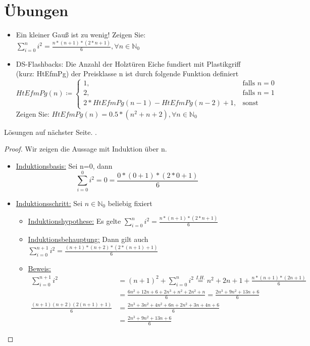 \documentclass[hidelinks]{article}
\theoremstyle{plain}
\theoremstyle{definition}
\theoremstyle{rem}
\begin{document}
\begin{sloppypar}
\section{Übungen}
\begin{itemize}
\item Ein kleiner Gauß ist zu wenig! Zeigen Sie: $\sum_{i=0}^{n}i^2=\frac{n*(n+1)*(2*n+1)}{6}, \forall n\in\mathbb{N}_0$
\item DS-Flashbacks: Die Anzahl der Holztüren Eiche fundiert mit Plastikgriff (kurz: HtEfmPg) der Preisklasse n ist durch folgende Funktion definiert
\begin{equation}
HtEfmPg(n)\coloneqq\begin{cases}
		1, & \text{falls $n=0$}\\
		2, & \text{falls $n=1$}\\
	   	2*HtEfmPg(n-1)-HtEfmPg(n-2)+1, & \text{sonst}
	\end{cases}
\end{equation}
Zeigen Sie: $HtEfmPg(n)=0.5*(n^2+n+2),\forall n\in\mathbb{N}_0$
\end{itemize}
Lösungen auf nächster Seite.
. \begin{proof}
Wir zeigen die Aussage mit Induktion über n.
\begin{itemize}
\item \underline{Induktionsbasis:} Sei n=0, dann
\begin{equation*}
	\sum_{i=0}^{0}i^2=0=\frac{0*(0+1)*(2*0+1)}{6}
\end{equation*}
\item \underline{Induktionsschritt:} Sei $n\in \mathbb{N}_0$ beliebig fixiert
	\begin{itemize}
	\item \underline{Induktionshypothese:} Es gelte $\sum_{i=0}^{n}i^2=\frac{n*(n+1)*(2*n+1)}{6}$
	\item \underline{Induktionsbehauptung:} Dann gilt auch $\sum_{i=0}^{n+1}i^2=\frac{(n+1)*(n+2)*(2*(n+1)+1)}{6}$
	\item \underline{Beweis:}
	\begin{align*}
		\sum_{i=0}^{n+1}i^2&=(n+1)^2+\sum_{i=0}^{n}i^2\stackrel{I.H.}{=}n^2+2n+1+\frac{n*(n+1)*(2n+1)}{6}\\
		&=\frac{6n^2+12n+6+2n^3+n^2+2n^2+n}{6}=\frac{2n^3+9n^2+13n+6}{6}\\
		\frac{(n+1)(n+2)(2(n+1)+1)}{6}&=\frac{2n^3+3n^2+4n^2+6n+2n^2+3n+4n+6}{6}\\
		&=\frac{2n^3+9n^2+13n+6}{6}
	\end{align*}

\end{itemize}
\end{itemize}
\end{proof}
\end{sloppypar}
\end{document}
